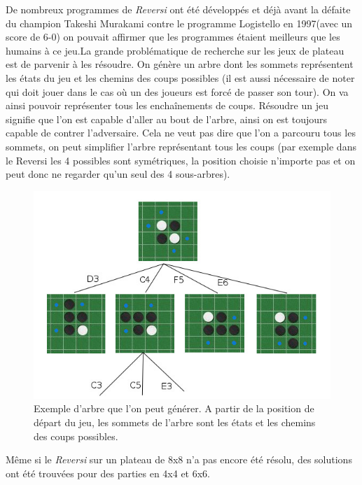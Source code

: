 \documentclass[12pt]{article}
\begin{document}
De nombreux programmes de \textit{Reversi} ont été développés et déjà avant la défaite du champion Takeshi Murakami contre le programme Logistello en 1997(avec un score de 6-0) on pouvait affirmer que les programmes étaient meilleurs que les humains à ce jeu.La grande problématique de recherche sur les jeux de plateau est de parvenir à les résoudre. On génère un arbre dont les sommets représentent les états du jeu et les chemins des coups possibles (il est aussi nécessaire de noter qui doit jouer dans le cas où un des joueurs est forcé de passer son tour). On va ainsi pouvoir représenter tous les enchaînements de coups. Résoudre un jeu signifie que l'on est capable d'aller au bout de l'arbre, ainsi on est toujours capable de contrer l'adversaire. Cela ne veut pas dire que l'on a parcouru tous les sommets, on peut simplifier l'arbre représentant tous les coups (par exemple dans le Reversi les 4 possibles sont symétriques, la position choisie n'importe pas et on peut donc ne regarder qu'un seul des 4 sous-arbres).
\begin{figure}[H]
\includegraphics[scale=0.6]{exemple_arbre.jpg}
\centering
\caption{Exemple d'arbre que l'on peut générer. A partir de la position de départ du jeu, les sommets de l'arbre sont les états et les chemins des coups possibles.}
\end{figure}

Même si le \textit{Reversi} sur un plateau de 8x8 n'a pas encore été résolu, des solutions ont été trouvées pour des parties en 4x4 et 6x6\cite{sol6x6}.
\end{document}

